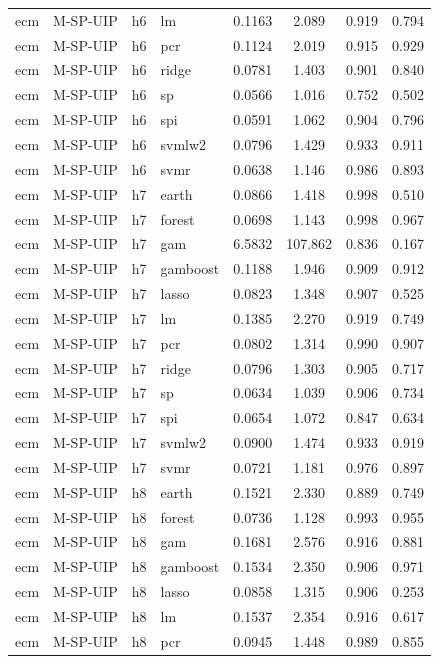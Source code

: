 \begin{ThreePartTable}
\begin{longtable}[t]{llclcccc}
ecm & M-SP-UIP & h6 & lm & 0.1163 & 2.089 & 0.919 & 0.794\\
ecm & M-SP-UIP & h6 & pcr & 0.1124 & 2.019 & 0.915 & 0.929\\
ecm & M-SP-UIP & h6 & ridge & 0.0781 & 1.403 & 0.901 & 0.840\\
ecm & M-SP-UIP & h6 & sp & 0.0566 & 1.016 & 0.752 & 0.502\\
ecm & M-SP-UIP & h6 & spi & 0.0591 & 1.062 & 0.904 & 0.796\\
ecm & M-SP-UIP & h6 & svmlw2 & 0.0796 & 1.429 & 0.933 & 0.911\\
ecm & M-SP-UIP & h6 & svmr & 0.0638 & 1.146 & 0.986 & 0.893\\
\addlinespace
ecm & M-SP-UIP & h7 & earth & 0.0866 & 1.418 & 0.998 & 0.510\\
ecm & M-SP-UIP & h7 & forest & 0.0698 & 1.143 & 0.998 & 0.967\\
ecm & M-SP-UIP & h7 & gam & 6.5832 & 107.862 & 0.836 & 0.167\\
ecm & M-SP-UIP & h7 & gamboost & 0.1188 & 1.946 & 0.909 & 0.912\\
ecm & M-SP-UIP & h7 & lasso & 0.0823 & 1.348 & 0.907 & 0.525\\
ecm & M-SP-UIP & h7 & lm & 0.1385 & 2.270 & 0.919 & 0.749\\
ecm & M-SP-UIP & h7 & pcr & 0.0802 & 1.314 & 0.990 & 0.907\\
ecm & M-SP-UIP & h7 & ridge & 0.0796 & 1.303 & 0.905 & 0.717\\
ecm & M-SP-UIP & h7 & sp & 0.0634 & 1.039 & 0.906 & 0.734\\
ecm & M-SP-UIP & h7 & spi & 0.0654 & 1.072 & 0.847 & 0.634\\
ecm & M-SP-UIP & h7 & svmlw2 & 0.0900 & 1.474 & 0.933 & 0.919\\
ecm & M-SP-UIP & h7 & svmr & 0.0721 & 1.181 & 0.976 & 0.897\\
\addlinespace
ecm & M-SP-UIP & h8 & earth & 0.1521 & 2.330 & 0.889 & 0.749\\
ecm & M-SP-UIP & h8 & forest & 0.0736 & 1.128 & 0.993 & 0.955\\
ecm & M-SP-UIP & h8 & gam & 0.1681 & 2.576 & 0.916 & 0.881\\
ecm & M-SP-UIP & h8 & gamboost & 0.1534 & 2.350 & 0.906 & 0.971\\
ecm & M-SP-UIP & h8 & lasso & 0.0858 & 1.315 & 0.906 & 0.253\\
ecm & M-SP-UIP & h8 & lm & 0.1537 & 2.354 & 0.916 & 0.617\\
ecm & M-SP-UIP & h8 & pcr & 0.0945 & 1.448 & 0.989 & 0.855\\

\end{longtable}
\end{ThreePartTable}
